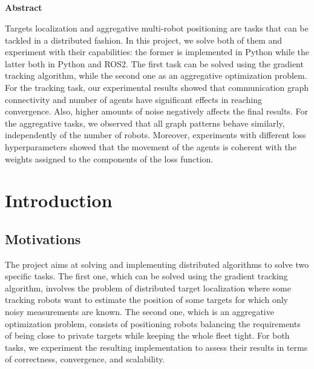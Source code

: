 \documentclass[a4paper,11pt,oneside]{book}
\begin{document}
\newpage
\thispagestyle{empty}

\begin{center}
\chapter*{}
\thispagestyle{empty}
{\Huge \textbf{Abstract}}\\
\vspace{15mm}
\end{center}

Targets localization and aggregative multi-robot positioning are tasks that can be tackled in a distributed fashion. In this project, we solve both of them and experiment with their capabilities: the former is implemented in Python while the latter both in Python and ROS2. The first task can be solved using the gradient tracking algorithm, while the second one as an aggregative optimization problem. For the tracking task, our experimental results showed that communication graph connectivity and number of agents have significant effects in reaching convergence. Also, higher amounts of noise negatively affects the final results. For the aggregative tasks, we observed that all graph patterns behave similarly, independently of the number of robots. Moreover, experiments with different loss hyperparameters showed that the movement of the agents is coherent with the weights assigned to the components of the loss function.

\tableofcontents \thispagestyle{empty}

\chapter*{Introduction}

\section*{Motivations} 

The project aims at solving and implementing distributed algorithms to solve two specific tasks. The first one, which can be solved using the gradient tracking algorithm, involves the problem of distributed target localization where some tracking robots want to estimate the position of some targets for which only noisy measurements are known. The second one, which is an aggregative optimization problem, consists of positioning robots balancing the requirements of being close to private targets while keeping the whole fleet tight. For both tasks, we experiment the resulting implementation to assess their results in terms of correctness, convergence, and scalability.
\end{document}
